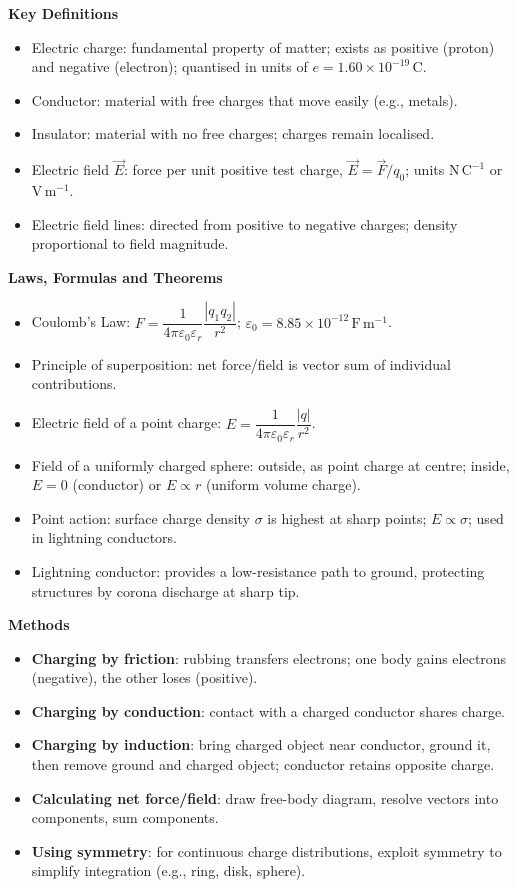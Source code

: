 \documentclass[11pt]{article}
\newcommand{\cle}[1]{{\popxbold\color{popdark}#1}}
\begin{document}
\begin{bilan}
\textbf{Key Definitions}
\begin{itemize}
\item \cle{Electric charge}: fundamental property of matter; exists as positive (proton) and negative (electron); quantised in units of $e=1.60\times10^{-19}\,\mathrm{C}$.
\item \cle{Conductor}: material with free charges that move easily (e.g., metals).
\item \cle{Insulator}: material with no free charges; charges remain localised.
\item \cle{Electric field} $\vec{E}$: force per unit positive test charge, $\vec{E}=\vec{F}/q_0$; units $\mathrm{N\,C^{-1}}$ or $\mathrm{V\,m^{-1}}$.
\item \cle{Electric field lines}: directed from positive to negative charges; density proportional to field magnitude.
\end{itemize}

\textbf{Laws, Formulas and Theorems}
\begin{itemize}
\item \cle{Coulomb's Law}: $F = \dfrac{1}{4\pi\varepsilon_0\varepsilon_r}\dfrac{|q_1q_2|}{r^2}$; $\varepsilon_0=8.85\times10^{-12}\,\mathrm{F\,m^{-1}}$.
\item \cle{Principle of superposition}: net force/field is vector sum of individual contributions.
\item \cle{Electric field of a point charge}: $E = \dfrac{1}{4\pi\varepsilon_0\varepsilon_r}\dfrac{|q|}{r^2}$.
\item \cle{Field of a uniformly charged sphere}: outside, as point charge at centre; inside, $E=0$ (conductor) or $E\propto r$ (uniform volume charge).
\item \cle{Point action}: surface charge density $\sigma$ is highest at sharp points; $E \propto \sigma$; used in lightning conductors.
\item \cle{Lightning conductor}: provides a low-resistance path to ground, protecting structures by corona discharge at sharp tip.
\end{itemize}

\textbf{Methods}
\begin{itemize}
\item \textbf{Charging by friction}: rubbing transfers electrons; one body gains electrons (negative), the other loses (positive).
\item \textbf{Charging by conduction}: contact with a charged conductor shares charge.
\item \textbf{Charging by induction}: bring charged object near conductor, ground it, then remove ground and charged object; conductor retains opposite charge.
\item \textbf{Calculating net force/field}: draw free-body diagram, resolve vectors into components, sum components.
\item \textbf{Using symmetry}: for continuous charge distributions, exploit symmetry to simplify integration (e.g., ring, disk, sphere).
\end{itemize}


\end{bilan}
\end{document}
